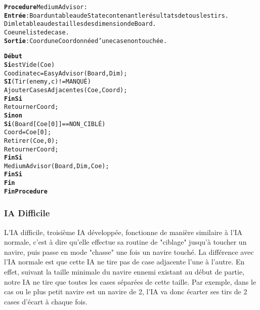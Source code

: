 \begin{alltt}
{\bf Procedure} MediumAdvisor :
    {\bf Entrée} : Board un tableau de State contenant le résultats de tous les tirs.
              Dim le tableau des tailles des dimension de Board.
              Coe une liste de case.
    {\bf Sortie} : Coord une Coordonnée d’une case non touchée.

    {\bf Début}
        {\bf Si} estVide(Coe) 
            Coodinate c = EasyAdvisor(Board, Dim) ;
            {\bf SI} (Tir(enemy, c) != MANQUÉ)
                AjouterCasesAdjacentes(Coe, Coord) ;
            {\bf FinSi}
            Retourner Coord ;
        {\bf Sinon} 
            {\bf Si} (Board[Coe[0]] == NON_CIBLÉ)
                Coord = Coe[0] ;
                Retirer(Coe, 0) ;
                Retourner Coord ;
            {\bf FinSi}
            MediumAdvisor(Board, Dim, Coe);
        {\bf FinSi}
    {\bf Fin}
{\bf Fin Procedure}            
\end{alltt}

\newpage

\subsubsection{IA Difficile}
    L'IA difficile, troisième IA développée, fonctionne de manière similaire à l'IA normale, c'est à dire qu'elle effectue sa routine de "ciblage" jusqu'à toucher un navire, puis passe en mode "chasse" une fois un navire touché.
    La différence avec l'IA normale est que cette IA ne tire pas de case adjacente l'une à l'autre. En effet, suivant la taille minimale du navire ennemi existant au début de partie, notre IA ne tire que toutes les cases séparées de cette taille.
    Par exemple, dans le cas ou le plus petit navire est un navire de 2, l'IA va donc écarter ses tirs de 2 cases d'écart à chaque fois.
    
